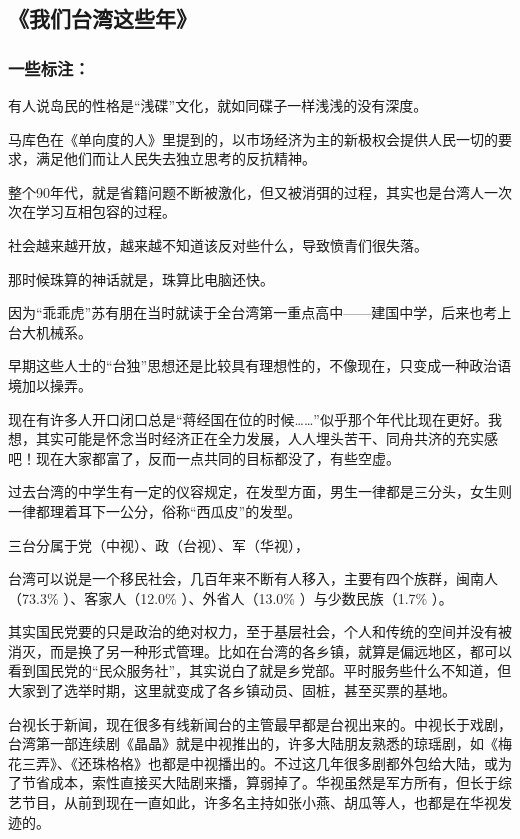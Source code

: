 \subsection{《我们台湾这些年》}

\subsubsection{一些标注：}
有人说岛民的性格是“浅碟”文化，就如同碟子一样浅浅的没有深度。

马库色在《单向度的人》里提到的，以市场经济为主的新极权会提供人民一切的要求，满足他们而让人民失去独立思考的反抗精神。

整个90年代，就是省籍问题不断被激化，但又被消弭的过程，其实也是台湾人一次次在学习互相包容的过程。

社会越来越开放，越来越不知道该反对些什么，导致愤青们很失落。

那时候珠算的神话就是，珠算比电脑还快。

因为“乖乖虎”苏有朋在当时就读于全台湾第一重点高中——建国中学，后来也考上台大机械系。

早期这些人士的“台独”思想还是比较具有理想性的，不像现在，只变成一种政治语境加以操弄。

现在有许多人开口闭口总是“蒋经国在位的时候……”似乎那个年代比现在更好。我想，其实可能是怀念当时经济正在全力发展，人人埋头苦干、同舟共济的充实感吧！现在大家都富了，反而一点共同的目标都没了，有些空虚。

过去台湾的中学生有一定的仪容规定，在发型方面，男生一律都是三分头，女生则一律都理着耳下一公分，俗称“西瓜皮”的发型。

三台分属于党（中视）、政（台视）、军（华视），

台湾可以说是一个移民社会，几百年来不断有人移入，主要有四个族群，闽南人（73.3\% ）、客家人（12.0\% ）、外省人（13.0\% ）与少数民族（1.7\% ）。

其实国民党要的只是政治的绝对权力，至于基层社会，个人和传统的空间并没有被消灭，而是换了另一种形式管理。比如在台湾的各乡镇，就算是偏远地区，都可以看到国民党的“民众服务社”，其实说白了就是乡党部。平时服务些什么不知道，但大家到了选举时期，这里就变成了各乡镇动员、固桩，甚至买票的基地。

台视长于新闻，现在很多有线新闻台的主管最早都是台视出来的。中视长于戏剧，台湾第一部连续剧《晶晶》就是中视推出的，许多大陆朋友熟悉的琼瑶剧，如《梅花三弄》、《还珠格格》也都是中视播出的。不过这几年很多剧都外包给大陆，或为了节省成本，索性直接买大陆剧来播，算弱掉了。华视虽然是军方所有，但长于综艺节目，从前到现在一直如此，许多名主持如张小燕、胡瓜等人，也都是在华视发迹的。


